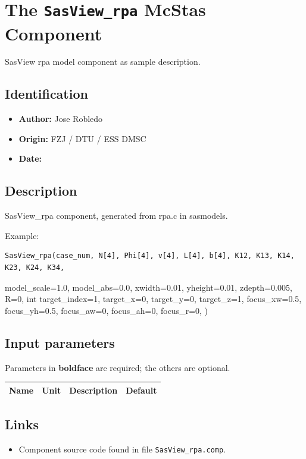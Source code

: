 \section{The \texttt{SasView\_rpa} McStas Component}
SasView rpa model component as sample description.

\subsection*{Identification}
\begin{itemize}
  \item \textbf{Author:} Jose Robledo
  \item \textbf{Origin:} FZJ / DTU / ESS DMSC
  \item \textbf{Date:} 
\end{itemize}

\subsection*{Description}
SasView\_rpa component, generated from rpa.c in sasmodels.

Example:

\begin{verbatim}
SasView_rpa(case_num, N[4], Phi[4], v[4], L[4], b[4], K12, K13, K14, K23, K24, K34,
\end{verbatim}

model\_scale=1.0, model\_abs=0.0, xwidth=0.01, yheight=0.01, zdepth=0.005, R=0, int target\_index=1, target\_x=0, target\_y=0, target\_z=1, focus\_xw=0.5, focus\_yh=0.5, focus\_aw=0, focus\_ah=0, focus\_r=0, )

\subsection*{Input parameters}
Parameters in \textbf{boldface} are required; the others are optional.

\begin{longtable}{p{}p{}p{}p{}}
\toprule
\textbf{Name} & \textbf{Unit} & \textbf{Description} & \textbf{Default} \\
\midrule
\endhead
\bottomrule
\end{longtable}

\subsection*{Links}
\begin{itemize}
  \item Component source code found in file \texttt{SasView\_rpa.comp}.
\end{itemize}

